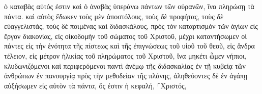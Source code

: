 \documentclass{openreader}
\begin{document}
ὁ καταβὰς αὐτός ἐστιν καὶ ὁ ἀναβὰς ὑπεράνω πάντων τῶν οὐρανῶν, ἵνα πληρώσῃ τὰ πάντα. 
καὶ αὐτὸς ἔδωκεν τοὺς μὲν ἀποστόλους, τοὺς δὲ προφήτας, τοὺς δὲ εὐαγγελιστάς, τοὺς δὲ ποιμένας καὶ διδασκάλους, 
πρὸς τὸν καταρτισμὸν τῶν ἁγίων εἰς ἔργον διακονίας, εἰς οἰκοδομὴν τοῦ σώματος τοῦ Χριστοῦ, 
μέχρι καταντήσωμεν οἱ πάντες εἰς τὴν ἑνότητα τῆς πίστεως καὶ τῆς ἐπιγνώσεως τοῦ υἱοῦ τοῦ θεοῦ, εἰς ἄνδρα τέλειον, εἰς μέτρον ἡλικίας τοῦ πληρώματος τοῦ Χριστοῦ, 
ἵνα μηκέτι ὦμεν νήπιοι, κλυδωνιζόμενοι καὶ περιφερόμενοι παντὶ ἀνέμῳ τῆς διδασκαλίας ἐν τῇ κυβείᾳ τῶν ἀνθρώπων ἐν πανουργίᾳ πρὸς τὴν μεθοδείαν τῆς πλάνης, 
ἀληθεύοντες δὲ ἐν ἀγάπῃ αὐξήσωμεν εἰς αὐτὸν τὰ πάντα, ὅς ἐστιν ἡ κεφαλή, ⸀Χριστός, 
\end{document}

